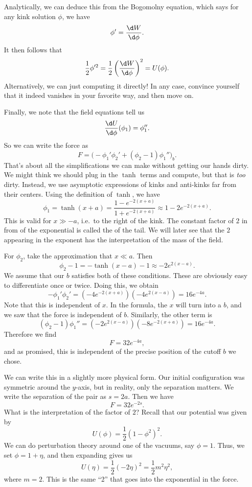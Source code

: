 \documentclass[a4paper]{article}
\begin{document}
Analytically, we can deduce this from the Bogomolny equation, which says for any kink solution $\phi$, we have
\[
  \phi' = \frac{\d W}{\d \phi}.
\]
It then follows that
\[
  \frac{1}{2} \phi'^2 = \frac{1}{2} \left(\frac{\d W}{\d \phi}\right)^2 = U(\phi).
\]
Alternatively, we can just computing it directly! In any case, convince yourself that it indeed vanishes in your favorite way, and then move on.

Finally, we note that the field equations tell us
\[
  \frac{\d U}{\d \phi}(\phi_1) = \phi_1''.
\]
So we can write the force as
\[
  F = \big(-\phi_1' \phi_2' + (\phi_2 - 1) \phi_1''\big)_b.
\]
That's about all the simplifications we can make without getting our hands dirty. We might think we should plug in the $\tanh$ terms and compute, but that is \emph{too} dirty. Instead, we use asymptotic expressions of kinks and anti-kinks far from their centers. Using the definition of $\tanh$, we have
\[
  \phi_1 = \tanh(x + a) = \frac{1 - e^{-2(x + a)}}{1 + e^{-2(x + a)}} \approx 1 - 2e^{-2(x + a)}.
\]
This is valid for $x \gg -a$, i.e.\ to the right of the kink. The constant factor of $2$ in from of the exponential is called the  of the tail. We will later see that the $2$ appearing in the exponent has the interpretation of the mass of the field.

For $\phi_2$, take the approximation that $x \ll a$. Then
\[
  \phi_2 - 1= -\tanh(x - a) - 1 \approx -2 e^{2(x - a)}.
\]
We assume that our $b$ satisfies both of these conditions. These are obviously easy to differentiate once or twice. Doing this, we obtain
\[
  -\phi_1' \phi_2' = (-4e^{-2(x + a)})(-4 e^{2(x - a)}) = 16 e^{-4a}.
\]
Note that this is independent of $x$. In the formula, the $x$ will turn into a $b$, and we saw that the force is independent of $b$. Similarly, the other term is
\[
  (\phi_2 - 1) \phi_1'' = (-2e^{2(x - a)}) (-8 e^{-2(x + a)}) = 16 e^{-4a}.
\]
Therefore we find
\[
  F = 32 e^{-4a},
\]
and as promised, this is independent of the precise position of the cutoff $b$ we chose.

We can write this in a slightly more physical form. Our initial configuration was symmetric around the $y$-axis, but in reality, only the separation matters. We write the separation of the pair as $s = 2a$. Then we have
\[
  F = 32 e^{-2s}.
\]
What is the interpretation of the factor of $2$? Recall that our potential was given by
\[
  U(\phi) = \frac{1}{2}(1 - \phi^2)^2.
\]
We can do perturbation theory around one of the vacuums, say $\phi = 1$. Thus, we set $\phi = 1 + \eta$, and then expanding gives us
\[
  U(\eta) = \frac{1}{2} (-2\eta)^2 = \frac{1}{2}m^2 \eta^2,
\]
where $m = 2$. This is the same ``2'' that goes into the exponential in the force.
\end{document}
